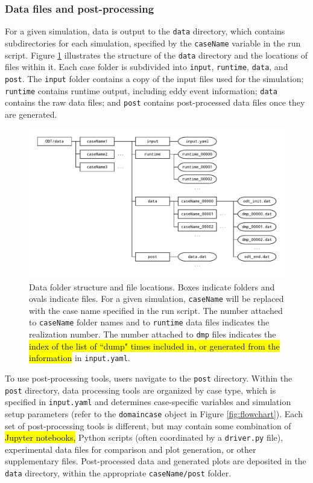 \documentclass[preprint,12pt, a4paper]{elsarticle}
\begin{document}
\subsubsection{Data files and post-processing}
\label{sec:data_files_post_processing}

For a given simulation, data is output to the \texttt{data} directory, which contains subdirectories for each simulation, specified by the \texttt{caseName} variable in the run script. Figure \ref{fig:data_folder_structure} illustrates the structure of the \texttt{data} directory and the locations of files within it. Each case folder is subdivided into \texttt{input}, \texttt{runtime}, \texttt{data}, and \texttt{post}. The \texttt{input} folder contains a copy of the input files used for the simulation; \texttt{runtime} contains runtime output, including eddy event information; \texttt{data} contains the raw data files; and \texttt{post} contains post-processed data files once they are generated. 

\begin{figure}
	\centering
    \includegraphics[width=\textwidth]{fig_data_folder_structure.pdf} 
    \caption{Data folder structure and file locations. Boxes indicate folders and ovals indicate files. For a given simulation, \texttt{caseName} will be replaced with the case name specified in the run script. The number attached to \texttt{caseName} folder names and to \texttt{runtime} data files indicates the realization number. The number attached to \texttt{dmp} files indicates the \hl{index of the list of ``dump" times included in, or generated from the information} in \texttt{input.yaml}.}
\label{fig:data_folder_structure}
\end{figure}

To use post-processing tools, users navigate to the \texttt{post} directory. Within the \texttt{post} directory, data processing tools are organized by case type, which is specified in \texttt{input.yaml} and determines case-specific variables and simulation setup parameters (refer to the \texttt{domaincase} object in Figure \ref{fig:flowchart}). Each set of post-processing tools is different, but may contain some combination of \hl{Jupyter notebooks,} Python scripts (often coordinated by a \texttt{driver.py} file), experimental data files for comparison and plot generation, or other supplementary files. Post-processed data and generated plots are deposited in the \texttt{data} directory, within the appropriate \texttt{caseName/post} folder.  
\end{document}

